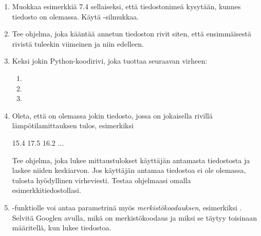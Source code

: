 \begin{enumerate}[\thesection .1]

\item Muokkaa esimerkkiä 7.4 sellaiseksi, että tiedostonimeä kysytään, kunnes tiedosto on olemassa. Käytä -silmukkaa.

\item Tee ohjelma, joka kääntää annetun tiedoston rivit siten, että ensimmäisestä rivistä tuleekin viimeinen ja niin edelleen.

\item Keksi jokin Python-koodirivi, joka tuottaa seuraavan virheen:

\begin{enumerate}
\item {}
\item {}
\item {}
\end{enumerate}

\item Oleta, että on olemassa jokin tiedosto, jossa on jokaisella rivillä lämpötilamittauksen tulos, esimerkiksi

\begin{output}
15.4
17.5
16.2
...
\end{output}

Tee ohjelma, joka lukee mittaustulokset käyttäjän antamasta tiedostosta ja laskee niiden keskiarvon. Jos käyttäjän antamaa tiedostoa ei ole olemassa, tulosta hyödyllinen virheviesti. Testaa ohjelmaasi omalla esimerkkitiedostollasi.

\item {}-funktiolle voi antaa parametrinä myös \textit{merkistökoodauksen}, esimerkiksi . Selvitä Googlen avulla, mikä on merkistökoodaus ja miksi se täytyy toisinaan määritellä, kun lukee tiedostoa.

\end{enumerate}

